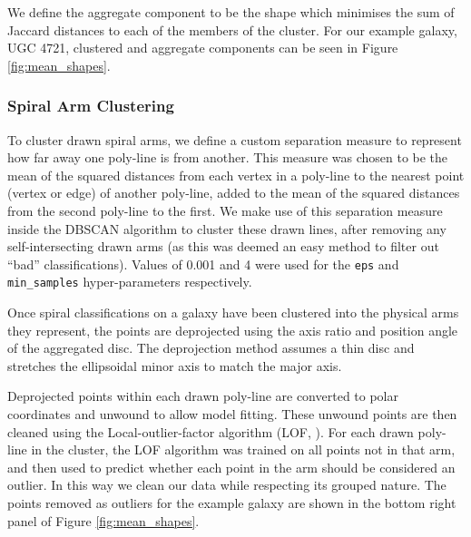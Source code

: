 \documentclass[main\.tex]{subfiles}
\begin{document}
We define the aggregate component to be the shape which minimises the sum of Jaccard distances to each of the members of the cluster. For our example galaxy, UGC 4721, clustered and aggregate components can be seen in Figure \ref{fig:mean_shapes}.

\subsubsection{Spiral Arm Clustering}
\label{sec:spiral_clustering}
To cluster drawn spiral arms, we define a custom separation measure to represent how far away one poly-line is from another. This measure was chosen to be the mean of the squared distances from each vertex in a poly-line to the nearest point (vertex or edge) of another poly-line, added to the mean of the squared distances from the second poly-line to the first. We make use of this separation measure inside the DBSCAN algorithm to cluster these drawn lines, after removing any self-intersecting drawn arms (as this was deemed an easy method to filter out ``bad'' classifications). Values of 0.001 and 4 were used for the \texttt{eps} and \texttt{min\_samples} hyper-parameters respectively.

Once spiral classifications on a galaxy have been clustered into the physical arms they represent, the points are deprojected using the axis ratio and position angle of the aggregated disc. The deprojection method assumes a thin disc and stretches the ellipsoidal minor axis to match the major axis.

Deprojected points within each drawn poly-line are converted to polar coordinates and unwound to allow model fitting. These unwound points are then cleaned using the Local-outlier-factor algorithm (LOF, \citealt{local-outlier-factor}). For each drawn poly-line in the cluster, the LOF algorithm was trained on all points not in that arm, and then used to predict whether each point in the arm should be considered an outlier. In this way we clean our data while respecting its grouped nature. The points removed as outliers for the example galaxy are shown in the bottom right panel of Figure \ref{fig:mean_shapes}.

\begin{figure*}
  \caption{Calculated aggregate components for UGC 4721. The aggregate disc is shown using a dot-dashed line and blue fill in the upper left panel, the aggregate bulge with a dotted line and orange fill in the upper right panel, the aggregate bar using a dashed line and green fill in the lower left panel and the aggregate spiral arms are plotted as red lines in the lower right panel. S\'ersic components are displayed at twice their effective radii. Black crosses in the lower right panel indicate spiral arm points that were identified as outliers and removed during cleaning (described in Section \ref{sec:spiral_clustering}). The aggregated components agree well with the underlying morphology, despite the noisiness of the classifications received.}
  \label{fig:mean_shapes}
\end{figure*}
\end{document}
